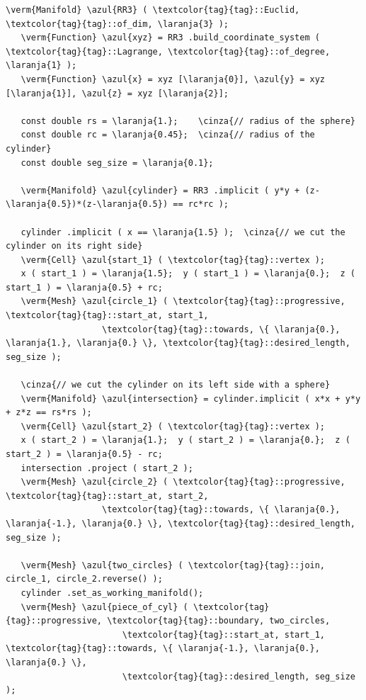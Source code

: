\begin{Verbatim}[commandchars=\\\{\},formatcom=\small\tt,frame=single,
   label=parag-\ref{\numb section 3.\numb parag 18}.cpp,rulecolor=\color{coment},
   baselinestretch=0.94,framesep=2mm                                            ]
   \verm{Manifold} \azul{RR3} ( \textcolor{tag}{tag}::Euclid, \textcolor{tag}{tag}::of_dim, \laranja{3} );
   \verm{Function} \azul{xyz} = RR3 .build_coordinate_system ( \textcolor{tag}{tag}::Lagrange, \textcolor{tag}{tag}::of_degree, \laranja{1} );
   \verm{Function} \azul{x} = xyz [\laranja{0}], \azul{y} = xyz [\laranja{1}], \azul{z} = xyz [\laranja{2}];

   const double rs = \laranja{1.};    \cinza{// radius of the sphere}
   const double rc = \laranja{0.45};  \cinza{// radius of the cylinder}
   const double seg_size = \laranja{0.1};

   \verm{Manifold} \azul{cylinder} = RR3 .implicit ( y*y + (z-\laranja{0.5})*(z-\laranja{0.5}) == rc*rc );

   cylinder .implicit ( x == \laranja{1.5} );  \cinza{// we cut the cylinder on its right side}
   \verm{Cell} \azul{start_1} ( \textcolor{tag}{tag}::vertex );
   x ( start_1 ) = \laranja{1.5};  y ( start_1 ) = \laranja{0.};  z ( start_1 ) = \laranja{0.5} + rc;
   \verm{Mesh} \azul{circle_1} ( \textcolor{tag}{tag}::progressive, \textcolor{tag}{tag}::start_at, start_1,
                   \textcolor{tag}{tag}::towards, \{ \laranja{0.}, \laranja{1.}, \laranja{0.} \}, \textcolor{tag}{tag}::desired_length, seg_size );

   \cinza{// we cut the cylinder on its left side with a sphere}
   \verm{Manifold} \azul{intersection} = cylinder.implicit ( x*x + y*y + z*z == rs*rs );
   \verm{Cell} \azul{start_2} ( \textcolor{tag}{tag}::vertex );
   x ( start_2 ) = \laranja{1.};  y ( start_2 ) = \laranja{0.};  z ( start_2 ) = \laranja{0.5} - rc;
   intersection .project ( start_2 );
   \verm{Mesh} \azul{circle_2} ( \textcolor{tag}{tag}::progressive, \textcolor{tag}{tag}::start_at, start_2,
                   \textcolor{tag}{tag}::towards, \{ \laranja{0.}, \laranja{-1.}, \laranja{0.} \}, \textcolor{tag}{tag}::desired_length, seg_size );

   \verm{Mesh} \azul{two_circles} ( \textcolor{tag}{tag}::join, circle_1, circle_2.reverse() );
   cylinder .set_as_working_manifold();
   \verm{Mesh} \azul{piece_of_cyl} ( \textcolor{tag}{tag}::progressive, \textcolor{tag}{tag}::boundary, two_circles,
                       \textcolor{tag}{tag}::start_at, start_1, \textcolor{tag}{tag}::towards, \{ \laranja{-1.}, \laranja{0.}, \laranja{0.} \},
                       \textcolor{tag}{tag}::desired_length, seg_size                          );


\end{Verbatim}
